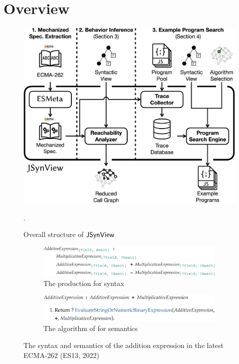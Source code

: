 \section{Overview}\label{sec:overview}

\begin{figure}
  \centering
  \includegraphics[width=\columnwidth]{img/overall.png}
  \caption{Overall structure of $\tool$}
  \vspace*{-1em}
  \label{fig:overall}.
\end{figure}

\begin{figure}
  \centering
  \begin{subfigure}[t]{\columnwidth}
    \centering
    \includegraphics[width=\columnwidth]{img/add-eval-bnf.png}
    \caption{The  production for syntax}
  \end{subfigure}
  \vspace*{.5em}
  \begin{subfigure}[t]{\columnwidth}
    \centering
    \includegraphics[width=\columnwidth]{img/add-eval-algo.png}
    \caption{The  algorithm of for semantics}
  \end{subfigure}
  \vspace*{-.5em}
  \caption{The syntax and semantics of the addition expression in the latest
  ECMA-262 (ES13, 2022)}
  \vspace*{-1.5em}
  \label{fig:add-eval}
\end{figure}

